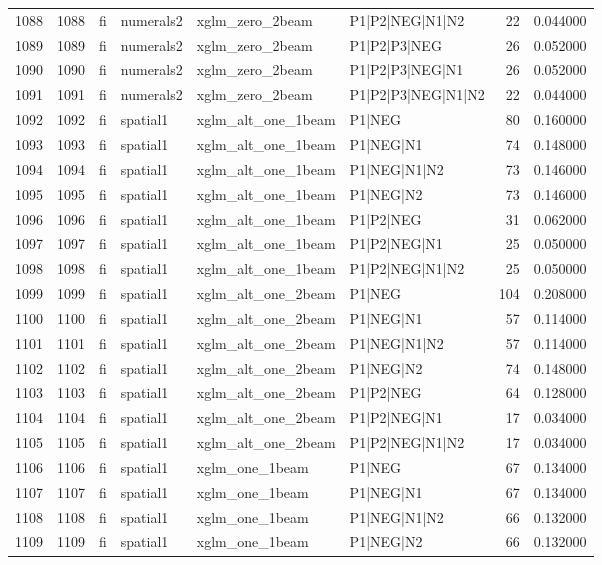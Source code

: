 \begin{tabular}{lrllllrr}
1088 & 1088 & fi & numerals2 & xglm_zero_2beam & P1|P2|NEG|N1|N2 & 22 & 0.044000 \\
1089 & 1089 & fi & numerals2 & xglm_zero_2beam & P1|P2|P3|NEG & 26 & 0.052000 \\
1090 & 1090 & fi & numerals2 & xglm_zero_2beam & P1|P2|P3|NEG|N1 & 26 & 0.052000 \\
1091 & 1091 & fi & numerals2 & xglm_zero_2beam & P1|P2|P3|NEG|N1|N2 & 22 & 0.044000 \\
1092 & 1092 & fi & spatial1 & xglm_alt_one_1beam & P1|NEG & 80 & 0.160000 \\
1093 & 1093 & fi & spatial1 & xglm_alt_one_1beam & P1|NEG|N1 & 74 & 0.148000 \\
1094 & 1094 & fi & spatial1 & xglm_alt_one_1beam & P1|NEG|N1|N2 & 73 & 0.146000 \\
1095 & 1095 & fi & spatial1 & xglm_alt_one_1beam & P1|NEG|N2 & 73 & 0.146000 \\
1096 & 1096 & fi & spatial1 & xglm_alt_one_1beam & P1|P2|NEG & 31 & 0.062000 \\
1097 & 1097 & fi & spatial1 & xglm_alt_one_1beam & P1|P2|NEG|N1 & 25 & 0.050000 \\
1098 & 1098 & fi & spatial1 & xglm_alt_one_1beam & P1|P2|NEG|N1|N2 & 25 & 0.050000 \\
1099 & 1099 & fi & spatial1 & xglm_alt_one_2beam & P1|NEG & 104 & 0.208000 \\
1100 & 1100 & fi & spatial1 & xglm_alt_one_2beam & P1|NEG|N1 & 57 & 0.114000 \\
1101 & 1101 & fi & spatial1 & xglm_alt_one_2beam & P1|NEG|N1|N2 & 57 & 0.114000 \\
1102 & 1102 & fi & spatial1 & xglm_alt_one_2beam & P1|NEG|N2 & 74 & 0.148000 \\
1103 & 1103 & fi & spatial1 & xglm_alt_one_2beam & P1|P2|NEG & 64 & 0.128000 \\
1104 & 1104 & fi & spatial1 & xglm_alt_one_2beam & P1|P2|NEG|N1 & 17 & 0.034000 \\
1105 & 1105 & fi & spatial1 & xglm_alt_one_2beam & P1|P2|NEG|N1|N2 & 17 & 0.034000 \\
1106 & 1106 & fi & spatial1 & xglm_one_1beam & P1|NEG & 67 & 0.134000 \\
1107 & 1107 & fi & spatial1 & xglm_one_1beam & P1|NEG|N1 & 67 & 0.134000 \\
1108 & 1108 & fi & spatial1 & xglm_one_1beam & P1|NEG|N1|N2 & 66 & 0.132000 \\
1109 & 1109 & fi & spatial1 & xglm_one_1beam & P1|NEG|N2 & 66 & 0.132000 \\

\end{tabular}
